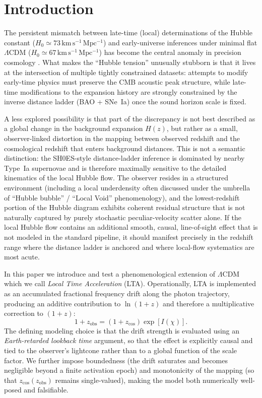 \documentclass[10pt]{article}
\newcommand{\zobs}{z_{\mathrm{obs}}}
\newcommand{\zcos}{z_{\mathrm{cos}}}
\begin{document}

\section{Introduction}
\label{sec:intro}

The persistent mismatch between late-time (local) determinations of the Hubble constant
($H_0 \simeq 73\,\mathrm{km\,s^{-1}\,Mpc^{-1}}$) and early-universe inferences under minimal flat
$\Lambda$CDM ($H_0 \simeq 67\,\mathrm{km\,s^{-1}\,Mpc^{-1}}$) has become the central anomaly in
precision cosmology \cite{Brout2022PantheonPlus,Riess2022SH0ES}.
What makes the ``Hubble tension'' unusually stubborn is that it lives at the intersection of
multiple tightly constrained datasets: attempts to modify early-time physics must preserve the
CMB acoustic peak structure, while late-time modifications to the expansion history are strongly
constrained by the inverse distance ladder (BAO + SNe~Ia) once the sound horizon scale is fixed.

A less explored possibility is that part of the discrepancy is not best described as a global
change in the background expansion $H(z)$, but rather as a small, observer-linked distortion in the
mapping between observed redshift and the cosmological redshift that enters background distances.
This is not a semantic distinction: the SH0ES-style distance-ladder inference is dominated by
nearby Type~Ia supernovae and is therefore maximally sensitive to the detailed kinematics of the
local Hubble flow.
The observer resides in a structured environment (including a local underdensity often discussed
under the umbrella of ``Hubble bubble'' / ``Local Void'' phenomenology), and the lowest-redshift
portion of the Hubble diagram exhibits coherent residual structure that is not naturally captured
by purely stochastic peculiar-velocity scatter alone.
If the local Hubble flow contains an additional smooth, causal, line-of-sight effect that is not
modeled in the standard pipeline, it should manifest precisely in the redshift range where the
distance ladder is anchored and where local-flow systematics are most acute.

In this paper we introduce and test a phenomenological extension of $\Lambda$CDM which we call
\emph{Local Time Acceleration} (LTA).
Operationally, LTA is implemented as an accumulated fractional frequency drift along the photon
trajectory, producing an additive contribution to $\ln(1+z)$ and therefore a multiplicative
correction to $(1+z)$:
\begin{equation}
1+\zobs = (1+\zcos)\exp[I(\chi)].
\end{equation}
The defining modeling choice is that the drift strength is evaluated using an \emph{Earth-retarded
lookback time} argument, so that the effect is explicitly causal and tied to the observer's
lightcone rather than to a global function of the scale factor.
We further impose boundedness (the drift saturates and becomes negligible beyond a finite
activation epoch) and monotonicity of the mapping (so that $\zcos(\zobs)$ remains single-valued),
making the model both numerically well-posed and falsifiable.
\end{document}
